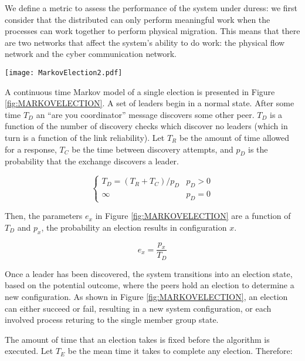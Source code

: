 We define a metric to assess the performance of the system under duress: we
first consider that the distributed can only perform meaningful work when the
processes can work together to perform physical migration. This means that
there are two networks that affect the system's ability to do work: the
physical flow network and the cyber communication network.


\begin{figure*}
\centering
\texttt{[image: MarkovElection2.pdf]}
\caption{A diagram showing a partial Markov chain for an election}
\label{fig:MARKOVELECTION}
\end{figure*}

A continuous time Markov model of a single election is presented in Figure \ref{fig:MARKOVELECTION}.
A set of leaders begin in a normal state. After some time $T_{D}$ an ``are you coordinator''
message discovers some other peer. $T_{D}$ is a function of the number of discovery
checks which discover no leaders (which in turn is a function of the link reliability). Let
$T_{R}$ be the amount of time allowed for a response, $T_{C}$ be the time between
discovery attempts, and $p_{D}$ is the probability that the exchange discovers a leader.

\begin{equation}
\begin{cases}
T_{D} = ( T_{R}+T_{C} ) / p_{D} & p_{D} > 0 \\
\infty & p_{D} = 0
\end{cases}
\end{equation}

Then, the parameters $e_x$ in Figure \ref{fig:MARKOVELECTION} are a function of $T_{D}$ and $p_{x}$,
the probability an election results in configuration $x$.

\begin{equation}
e_x = \frac{p_{x}}{T_{D}}
\end{equation}

Once a leader has been discovered, the system transitions into an election state, based on the
potential outcome, where the peers hold an election to determine a new configuration. As shown
in Figure \ref{fig:MARKOVELECTION}, an election can either succeed or fail, resulting in a new system
configuration, or each involved process returing to the single member group state.
 
The amount of time that an election takes is fixed before the algorithm is executed. 
Let $T_{E}$ be the mean time it takes to complete any election. Therefore:

